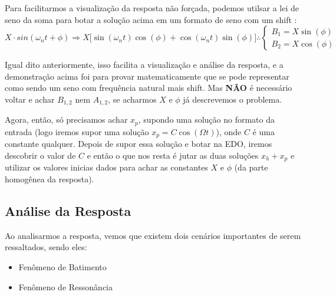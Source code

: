 \documentclass{article}
\begin{document}
Para facilitarmos a visualização da resposta não forçada, podemos utilsar a lei de seno da soma para botar a solução acima em um formato de seno com um shift :
$$X \cdot sin(\omega_n t + \phi)\Rightarrow X\big[\sin(\omega_n t)\cos(\phi) + \cos(\omega_n t)\sin(\phi)\big] \therefore \begin{cases}
        B_1 = X\sin(\phi) \\
        B_2 = X\cos(\phi)
    \end{cases}$$

Igual dito anteriormente, isso facilita a visualização e análise da resposta, e a demonstração acima foi para provar matematicamente que se pode representar como sendo um seno com
frequência natural mais shift. Mas \textbf{NÃO} é necessário voltar e achar $B_{1,2}$ nem $A_{1,2}$, se acharmos $X$ e $\phi$ já descrevemos o problema.


Agora, então, só precisamos achar $x_p$, supondo uma solução no formato da entrada (logo iremos supor uma solução $x_p = C \cos(\Omega t)$), onde $C$ é uma constante qualquer. Depois
de supor essa solução e botar na EDO, iremos descobrir o valor de $C$ e então o que nos resta é jutar as duas soluções $x_h + x_p$ e utilizar os valores inicias dados para achar as
constantes $X$ e $\phi$ (da parte homogênea da resposta).

\subsection{Análise da Resposta}
Ao analisarmos a resposta, vemos que existem dois cenários importantes de serem ressaltados, sendo eles:
\begin{itemize}
    \item Fenômeno de Batimento
    \item Fenômeno de Ressonância
\end{itemize}
\end{document}
